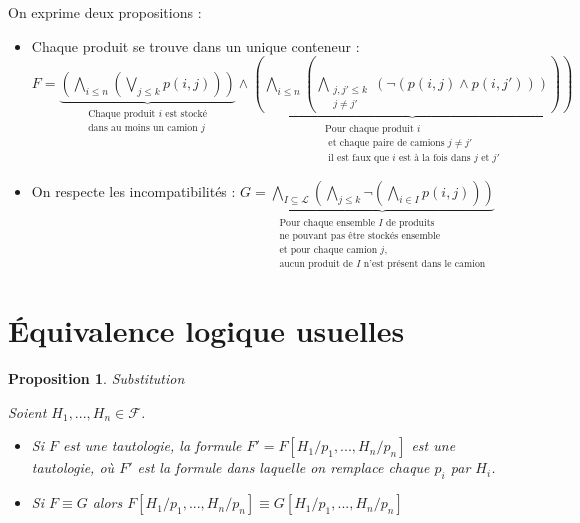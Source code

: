 \documentclass[]{article}
\newtheorem{myproposition}{Proposition}
\theoremstyle{remark}
\theoremstyle{definition}
\begin{document}
On exprime deux propositions :
\begin{itemize}
	\item Chaque produit se trouve dans un unique conteneur :
	$F = \underbrace{\left(\bigwedge\limits_{i \leqslant n} \left(\bigvee\limits_{j \leqslant k} p(i, j)\right) \right)}_{\substack{\text{Chaque produit } i \text{ est stocké} \\ \text{dans au moins un camion } j}} \land
	\underbrace{\left(\bigwedge\limits_{i \leqslant n} \left(\bigwedge\limits_{\substack{j, j' \leqslant k \\ j \neq j'}}(\neg\left(p(i, j) \land p(i, j')\right))\right)\right)}_{\substack{\text{Pour chaque produit } i \\ \text{ et chaque paire de camions } j \neq j' \\ \text{ il est faux que  } i \text{ est à la fois dans } j \text{ et } j'}}$
	
	\item On respecte les incompatibilités : $G = \underbrace{\bigwedge\limits_{I \subseteq \mathcal{L}} \left( \bigwedge\limits_{j \leqslant k}\neg \left( \bigwedge\limits_{i \in I}p(i, j)\right)\right)}_{\substack{\text{Pour chaque ensemble } I \text{ de produits } \\ \text{ne pouvant pas être stockés ensemble} \\ \text{et pour chaque camion } j , \\ \text{aucun produit de } I \text{ n'est présent dans le camion}}}$
\end{itemize}

\section{Équivalence logique usuelles}

\begin{myproposition}Substitution

	Soient $H_1, ..., H_n \in \mathcal{F}$.
	\begin{itemize}
		\item Si $F$ est une tautologie, la formule $F'=F[H_1/p_1, ..., H_n/p_n]$ est une tautologie, où $F'$ est la formule dans laquelle on remplace chaque $p_i$ par $H_i$.
	
		\item Si $F \equiv G$ alors $F[H_1/p_1,...,H_n/p_n] \equiv G[H_1/p_1,...,H_n/p_n]$
	\end{itemize}
\end{myproposition}
\end{document}
